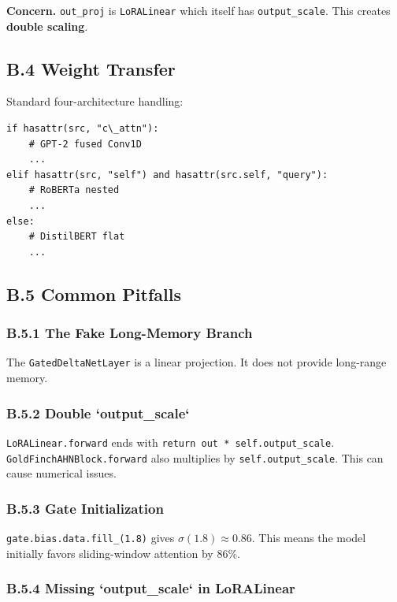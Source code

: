 \textbf{Concern.} \texttt{out\_proj} is \texttt{LoRALinear} which itself has \texttt{output\_scale}. 
This creates \textbf{double scaling}.

\subsection{B.4 Weight Transfer}

Standard four-architecture handling:

\begin{lstlisting}
if hasattr(src, "c\_attn"):
    # GPT-2 fused Conv1D
    ...
elif hasattr(src, "self") and hasattr(src.self, "query"):
    # RoBERTa nested
    ...
else:
    # DistilBERT flat
    ...
\end{lstlisting}

\subsection{B.5 Common Pitfalls}

\subsubsection{B.5.1 The Fake Long-Memory Branch}

The \texttt{GatedDeltaNetLayer} is a linear projection. It does not provide long-range 
memory.

\subsubsection{B.5.2 Double `output\_scale`}

\texttt{LoRALinear.forward} ends with \texttt{return out * self.output\_scale}. 
\texttt{GoldFinchAHNBlock.forward} also multiplies by \texttt{self.output\_scale}. This 
can cause numerical issues.

\subsubsection{B.5.3 Gate Initialization}

\texttt{gate.bias.data.fill\_(1.8)} gives $\sigma(1.8) \approx 0.86$. This means 
the model initially favors sliding-window attention by 86\%.

\subsubsection{B.5.4 Missing `output\_scale` in LoRALinear}

